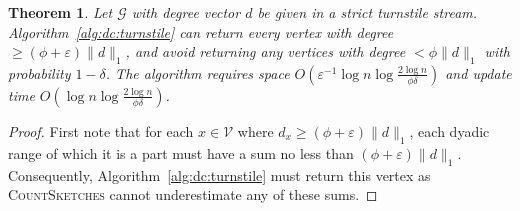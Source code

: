 \documentclass{report}
\newtheorem{theorem}{Theorem}[section]
\newcommand{\algoname}[1]{\textnormal{\textsc{#1}}}
\begin{document}
\begin{theorem} \label{thm:dchh:turnstile}
Let $\mathcal{G}$ with degree vector $d$ be given in a strict turnstile stream.
Algorithm~\ref{alg:dc:turnstile} can return every vertex with degree $\geq (\phi + \varepsilon)\|d\|_1$, and avoid returning any vertices with degree $< \phi\|d\|_1$ with probability $1-\delta$.
The algorithm requires space $O \left ( \varepsilon^{-1} \log n \log \frac{2 \log n}{\phi\delta} \right )$ and update time $O \left ( \log n \log \frac{2 \log n}{\phi \delta} \right )$.
\end{theorem}

\begin{proof}
First note that for each $x \in \mathcal{V}$ where $d_x \geq (\phi + \varepsilon) \|d\|_1$, each dyadic range of which it is a part must have a sum no less than $(\phi + \varepsilon) \|d\|_1$. 
Consequently, Algorithm~\ref{alg:dc:turnstile} must return this vertex as \algoname{CountSketches} cannot underestimate any of these sums.


\end{proof}
\end{document}
